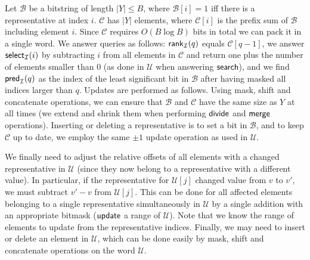 Let $\mathcal{B}$ be a bitstring of length $|Y|\leq B$, where $\mathcal{B}[i] = 1$ iff there is a representative at index $i$. $\mathcal{C}$ has $|Y|$ elements, where $\mathcal{C}[i]$ is the prefix sum of $\mathcal{B}$ including element $i$. Since $\mathcal{C}$ requires $O(B \log B)$ bits in total we can pack it in a single word. We answer queries as follows: $\mathsf{rank}_\mathcal{I}(q)$ equals $\mathcal{C}[q-1]$, we answer $\mathsf{select}_\mathcal{I}(i)$ by subtracting $i$ from all elements in $\mathcal{C}$ and return one plus the number of elements smaller than $0$ (as done in $\mathcal{U}$ when answering $\mathsf{search}$), and we find $\mathsf{pred}_\mathcal{I}(q)$ as the index of the least significant bit in $\mathcal{B}$ after having masked all indices larger than $q$.
Updates are performed as follows. Using mask, shift and concatenate operations, we can ensure that $\mathcal{B}$ and $\mathcal{C}$ have the same size as $Y$ at all times (we extend and shrink them when performing $\mathsf{divide}$ and $\mathsf{merge}$ operations). Inserting or deleting a representative is to set a bit in $\mathcal{B}$, and to keep $\mathcal{C}$ up to date, we employ the same $\pm 1$ update operation as used in $\mathcal{U}$.


We finally need to adjust the relative offsets of all elements with a changed representative in $\mathcal{U}$ (since they now belong to a representative with a different value).
In particular, if the representative for $\mathcal{U}[j]$ changed value from $v$ to $v'$, we must subtract $v' - v$ from $\mathcal{U}[j]$. 
This can be done for all affected elements belonging to a single representative simultaneously in $\mathcal{U}$ by a single addition with an appropriate bitmask ($\mathsf{update}$ a range of $\mathcal{U}$). Note that we know the range of elements to update from the representative indices. Finally, we may need to insert or delete an element in $\mathcal{U}$, which can be done easily by mask, shift and concatenate operations on the word $\mathcal{U}$.



